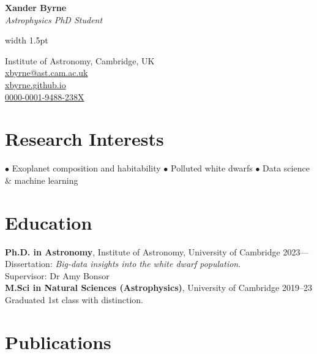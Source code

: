 \documentclass[a4paper,10pt]{article}
\makeatletter
\def\name{Xander Byrne}
\def\position{Astrophysics PhD Student}
\def\email{
    \href{mailto:xbyrne@ast.cam.ac.uk}{xbyrne@ast.cam.ac.uk}
}
\def\website{
    \href{https://xbyrne.github.io}{xbyrne.github.io}
}
\def\address{
    Institute of Astronomy,
    Cambridge, UK
}
\def\orcid{
    \href{https://orcid.org/0000-0001-9488-238X}{0000-0001-9488-238X}
}
\makeatother
\begin{document}
\noindent
\begin{minipage}[t]{0.73\textwidth}
    \vspace{1.2ex} %
    {\fontsize{50}{55}\selectfont \textbf{\name}}\\[0.3em]
    {\fontsize{20.5}{30}\textit{\position}}
\end{minipage}
{\color{highlight}\vrule width 1.5pt}
\begin{minipage}[t]{0.27\textwidth}
\raggedleft
{\fontsize{11}{12}\selectfont
\vspace{.3em}
    \address \faMapMarker* \\[.3em]
    \email \faEnvelope[regular] \\[.1em]
    \website \faGithub \\[.3em]
    \orcid \faOrcid
}
\end{minipage}


\section*{Research Interests}
$\bullet$ Exoplanet composition and habitability
\hspace{1.5em}
$\bullet$ Polluted white dwarfs
\hspace{1.5em}
$\bullet$ Data science \& machine learning

\section*{Education}
\textbf{Ph.D. in Astronomy}, Institute of Astronomy, University of Cambridge \hfill 2023---\\
Dissertation: \textit{Big-data insights into the white dwarf population}.\\
Supervisor: Dr Amy Bonsor\\

\noindent \textbf{M.Sci in Natural Sciences (Astrophysics)}, University of Cambridge \hfill 2019--23 \\
Graduated 1st class with distinction.

\section*{Publications}
\end{document}
